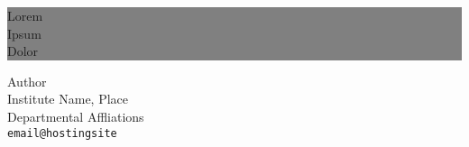 \thispagestyle{empty} %


\colorbox{grey}{
	\parbox[t]{1.0\linewidth}{
		\centering \fontsize{50pt}{80pt}\selectfont %
		\vspace*{0.7cm} %
		
		\hfill Lorem \\
		\hfill Ipsum   \\
		\hfill Dolor\\
		
		\vspace*{0.7cm} %
	}
}


\vfill %


{\centering \large 
\hfill Author\\
\hfill Institute Name, Place \\
\hfill Departmental Affliations \\
\hfill \texttt{email@hostingsite} \\

\HRule{1pt}} %


\clearpage %
